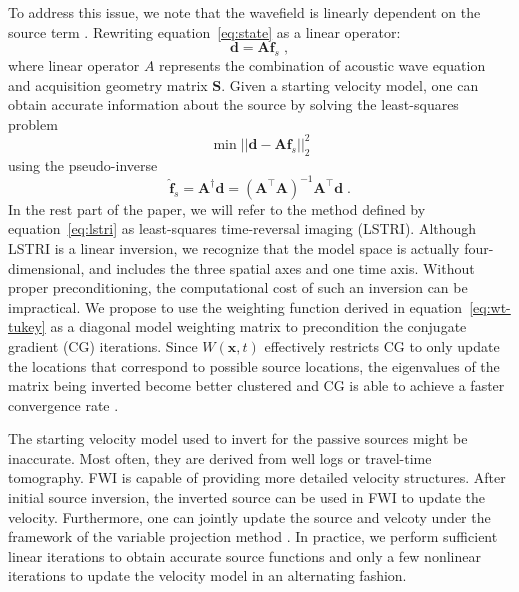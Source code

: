 To address this issue, we note that the wavefield is linearly dependent on the source term \cite[]{rickett13}. Rewriting equation~\ref{eq:state} as a linear operator:
\begin{equation}
    \label{eq:forward}
    \mathbf{d} = \mathbf{A} \mathbf{f}_s \;,
\end{equation}
where linear operator $A$ represents the combination of acoustic wave equation and acquisition geometry matrix $\mathbf{S}$. Given a starting velocity model, one can obtain accurate information about the source by solving the least-squares problem
\begin{equation}
    \label{eq:lsq}
    \min|| \mathbf{d}-\mathbf{A}\mathbf{f}_s ||_2^2
\end{equation}
using the pseudo-inverse
\begin{equation}
    \label{eq:lstri}
    \hat{\mathbf{f}}_s = \mathbf{A}^{\dagger} \mathbf{d} = (\mathbf{A}^{\intercal}\mathbf{A})^{-1}\mathbf{A}^{\intercal} \mathbf{d} \;.
\end{equation}
In the rest part of the paper, we will refer to the method defined by equation~\ref{eq:lstri} as least-squares time-reversal imaging (LSTRI). Although LSTRI is a linear inversion, we recognize that the model space is actually four-dimen\-sional, and includes the three spatial axes and one time axis. Without proper preconditioning, the computational cost of such an inversion can be impractical. We propose to use the weighting function derived in equation~\ref{eq:wt-tukey} as a diagonal model weighting matrix to precondition the conjugate gradient (CG) iterations. Since $W(\mathbf{x},t)$ effectively restricts CG to only update the locations that correspond to possible source locations, the eigenvalues of the matrix being inverted become better clustered and CG is able to achieve a faster convergence rate \cite[]{shewchuk94}.

The starting velocity model used to invert for the passive sources might be inaccurate. Most often, they are derived from well logs or travel-time tomography. FWI is capable of providing more detailed velocity structures. After initial source inversion, the inverted source can be used in FWI to update the velocity. Furthermore, one can jointly update the source and velcoty under the framework of the variable projection method \cite[]{golub73,aravkin12,rickett13}. In practice, we perform sufficient linear iterations to obtain accurate source functions and only a few nonlinear iterations to update the velocity model in an alternating fashion.

